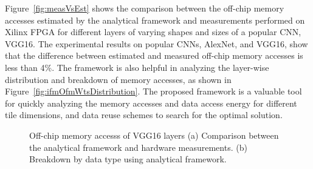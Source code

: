 Figure~\ref{fig:measVsEst} shows the comparison between the off-chip memory accesses estimated by the analytical framework and measurements performed on Xilinx FPGA for different layers of varying shapes and sizes of a popular CNN, VGG16. The experimental results on popular CNNs, AlexNet, and VGG16, show that the difference between estimated and measured off-chip memory accesses is less than 4\%. The framework is also helpful in analyzing the layer-wise distribution and breakdown of memory accesses, as shown in Figure~\ref{fig:ifmOfmWtsDistribution}. The proposed framework is a valuable tool for quickly analyzing the memory accesses and data access energy for different tile dimensions, and data reuse schemes to search for the optimal solution. 
\begin{figure}[!htb]
	\centering
	\captionsetup{font=sf}
	\hfil
	\hfil   
	\caption{Off-chip memory accesss of VGG16 layers (a) Comparison between the analytical framework and hardware measurements. (b) Breakdown by data type using analytical framework.}
	\label{fig:nnLayerData}
\end{figure}

